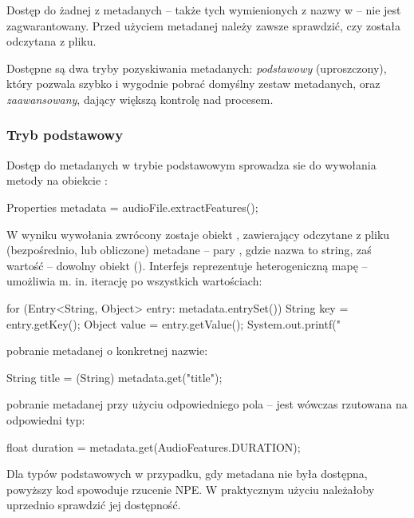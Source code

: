 \begin{Caution}
Dostęp do żadnej z metadanych -- także tych wymienionych z nazwy w  -- nie jest
zagwarantowany.  Przed użyciem metadanej należy zawsze sprawdzić, czy została odczytana z pliku.
\end{Caution}

Dostępne są dwa tryby pozyskiwania metadanych: \emph{podstawowy} (uproszczony), który pozwala szybko
i wygodnie pobrać domyślny zestaw metadanych, oraz \emph{zaawansowany}, dający większą kontrolę nad
procesem.

\subsubsection{Tryb podstawowy}


Dostęp do metadanych w trybie podstawowym sprowadza sie do wywołania metody 
na obiekcie :

\begin{java}
Properties metadata = audioFile.extractFeatures();
\end{java}

W wyniku wywołania zwrócony zostaje obiekt ,
zawierający odczytane z pliku (bezpośrednio, lub obliczone) metadane -- pary , gdzie nazwa to string, zaś wartość -- dowolny obiekt ().
Interfejs  reprezentuje heterogeniczną mapę -- umożliwia m. in. iterację po
wszystkich wartościach:

\begin{java}
for (Entry<String, Object> entry: metadata.entrySet()) {
    String key = entry.getKey();
    Object value = entry.getValue();
    System.out.printf("%
}
\end{java}

pobranie metadanej o konkretnej nazwie:

\begin{java}
String title = (String) metadata.get("title");
\end{java}

pobranie metadanej przy użyciu odpowiedniego pola  -- jest wówczas rzutowana na
odpowiedni typ:

\begin{java}
float duration = metadata.get(AudioFeatures.DURATION);
\end{java}

\begin{Warning}
Dla typów podstawowych w przypadku, gdy metadana  nie była dostępna, powyższy kod
spowoduje rzucenie NPE. W praktycznym użyciu należałoby uprzednio sprawdzić jej dostępność.
\end{Warning}

